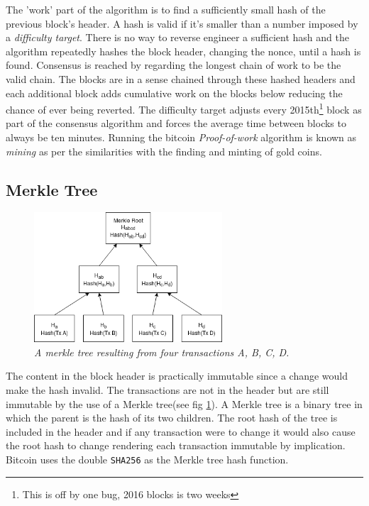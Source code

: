 The 'work' part of the algorithm is to find a sufficiently small hash of the previous block's header. A hash is valid if it's smaller than a number imposed by a \textit{difficulty target}. There is no way to reverse engineer a sufficient hash and the algorithm repeatedly hashes the block header, changing the nonce, until a hash is found. Consensus is reached by regarding the longest chain of work to be the valid chain. The blocks are in a sense chained through these hashed headers and each additional block adds cumulative work on the blocks below reducing the chance of ever being reverted. The difficulty target adjusts every 2015th\footnote{This is off by one bug, 2016 blocks is two weeks} block\cite{repository:bitcoin} as part of the consensus algorithm and forces the average time between blocks to always be ten minutes. Running the bitcoin \textit{Proof-of-work} algorithm is known as \textit{mining} as per the similarities with the finding and minting of gold coins.

\subsection{Merkle Tree}

\begin{figure}[!htb]
	
	\centering
	\includegraphics[width=7cm]{images/merkle.png}
	\caption{\textit{A merkle tree resulting from four transactions A, B, C, D.
	}}
	\label{fig:merkle:tree}
	
\end{figure}

The content in the block header is practically immutable since a change would make the hash invalid. The transactions are not in the header but are still immutable by the use of a Merkle tree(see fig \ref{fig:merkle:tree}). A Merkle tree is a binary tree in which the parent is the hash of its two children. The root hash of the tree is included in the header and if any transaction were to change it would also cause the root hash to change rendering each transaction immutable by implication. Bitcoin uses the double \texttt{SHA256} as the Merkle tree hash function.

